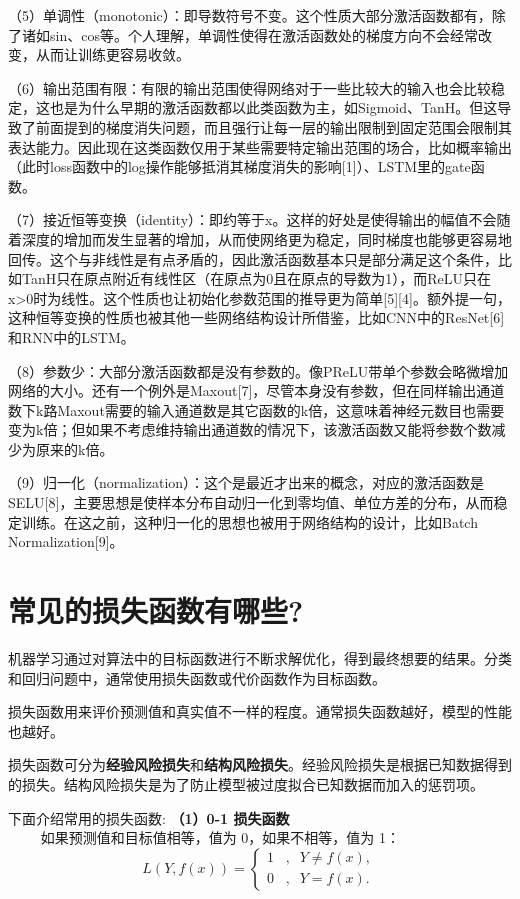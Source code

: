 （5）单调性（monotonic）：即导数符号不变。这个性质大部分激活函数都有，除了诸如sin、cos等。个人理解，单调性使得在激活函数处的梯度方向不会经常改变，从而让训练更容易收敛。

（6）输出范围有限：有限的输出范围使得网络对于一些比较大的输入也会比较稳定，这也是为什么早期的激活函数都以此类函数为主，如Sigmoid、TanH。但这导致了前面提到的梯度消失问题，而且强行让每一层的输出限制到固定范围会限制其表达能力。因此现在这类函数仅用于某些需要特定输出范围的场合，比如概率输出（此时loss函数中的log操作能够抵消其梯度消失的影响{[}1{]}）、LSTM里的gate函数。

（7）接近恒等变换（identity）：即约等于x。这样的好处是使得输出的幅值不会随着深度的增加而发生显著的增加，从而使网络更为稳定，同时梯度也能够更容易地回传。这个与非线性是有点矛盾的，因此激活函数基本只是部分满足这个条件，比如TanH只在原点附近有线性区（在原点为0且在原点的导数为1），而ReLU只在x\textgreater{}0时为线性。这个性质也让初始化参数范围的推导更为简单{[}5{]}{[}4{]}。额外提一句，这种恒等变换的性质也被其他一些网络结构设计所借鉴，比如CNN中的ResNet{[}6{]}和RNN中的LSTM。

（8）参数少：大部分激活函数都是没有参数的。像PReLU带单个参数会略微增加网络的大小。还有一个例外是Maxout{[}7{]}，尽管本身没有参数，但在同样输出通道数下k路Maxout需要的输入通道数是其它函数的k倍，这意味着神经元数目也需要变为k倍；但如果不考虑维持输出通道数的情况下，该激活函数又能将参数个数减少为原来的k倍。

（9）归一化（normalization）：这个是最近才出来的概念，对应的激活函数是SELU{[}8{]}，主要思想是使样本分布自动归一化到零均值、单位方差的分布，从而稳定训练。在这之前，这种归一化的思想也被用于网络结构的设计，比如Batch
Normalization{[}9{]}。

\section{常见的损失函数有哪些?}\label{ux5e38ux89c1ux7684ux635fux5931ux51fdux6570ux6709ux54eaux4e9b}

机器学习通过对算法中的目标函数进行不断求解优化，得到最终想要的结果。分类和回归问题中，通常使用损失函数或代价函数作为目标函数。

损失函数用来评价预测值和真实值不一样的程度。通常损失函数越好，模型的性能也越好。

损失函数可分为\textbf{经验风险损失}和\textbf{结构风险损失}。经验风险损失是根据已知数据得到的损失。结构风险损失是为了防止模型被过度拟合已知数据而加入的惩罚项。

下面介绍常用的损失函数: \textbf{（1）0-1 损失函数}\\
   如果预测值和目标值相等，值为 0，如果不相等，值为 1： \[
L(Y,f(x))=
\left\{
\begin{array}{}
1\;\;\;,\;\;Y\ne f(x), \\
0\;\;\;,\;\;Y=f(x).
\end{array}
\right.
\]

